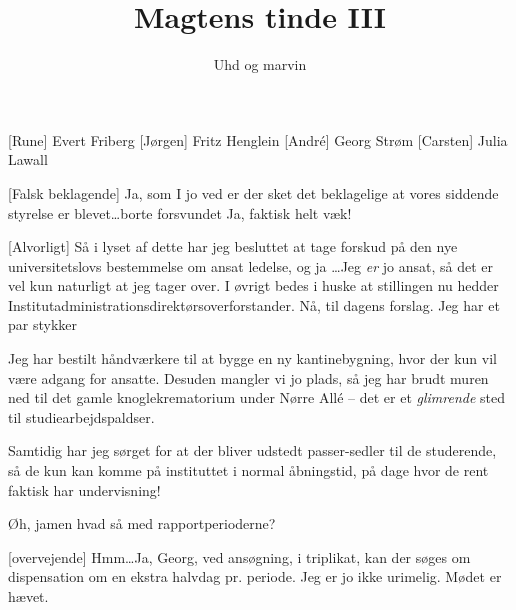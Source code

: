 \documentclass[a4paper,11pt]{article}
\title{Magtens tinde III}
\author{Uhd og marvin}
\begin{document}
\maketitle

\begin{roles}
  [Rune] Evert Friberg
  [Jørgen] Fritz Henglein
  [Andr\'e] Georg Strøm
  [Carsten] Julia Lawall
\end{roles}

\begin{props}
\end{props}

\begin{sketch}
  
  [Falsk beklagende] Ja, som I jo ved er der sket det
  beklagelige at vores siddende styrelse er blevet\ldots borte
   forsvundet  Ja, faktisk helt væk!
  
  [Alvorligt] Så i lyset af dette har jeg besluttet at tage
  forskud på den nye universitetslovs bestemmelse om ansat ledelse, og
  ja \ldots Jeg \emph{er} jo ansat, så det er vel kun naturligt at jeg
  tager over. I øvrigt bedes i huske at stillingen nu hedder
  Institutadministrationsdirektørsoverforstander. Nå, til dagens
  forslag. Jeg har et par stykker 
  
   Jeg har bestilt håndværkere til at bygge en ny
  kantinebygning, hvor der kun vil være adgang for ansatte. Desuden
  mangler vi jo plads, så jeg har brudt muren ned til det gamle
  knoglekrematorium under Nørre All\'e -- det er et \emph{glimrende} sted til 
  studiearbejdspaldser.
 
  Samtidig har jeg sørget for at
  der bliver udstedt passer-sedler til de studerende, så de kun kan
  komme på instituttet i normal åbningstid, på dage hvor de rent
  faktisk har undervisning!
  
  
   Øh, jamen hvad så med rapportperioderne?
  
  [overvejende] Hmm\ldots Ja, Georg, ved ansøgning, i triplikat, kan
  der søges om dispensation om en ekstra halvdag pr. periode. Jeg er
  jo ikke urimelig. Mødet er hævet.
  
\end{sketch}
\end{document}

